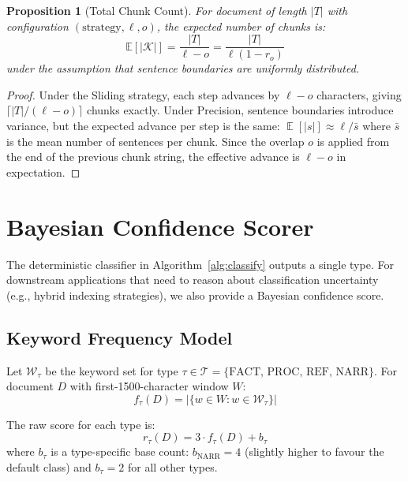 \documentclass[conference]{IEEEtran}
\newtheorem{proposition}[theorem]{Proposition}
\DeclareMathOperator{\E}{\mathbb{E}}
\begin{document}
\begin{proposition}[Total Chunk Count]
\label{prop:chunks}
For document of length $|T|$ with configuration
$(\text{strategy}, \ell, o)$, the expected number of
chunks is:
\begin{equation}
  \mathbb{E}[|\mathcal{K}|] = \frac{|T|}{\ell - o}
    = \frac{|T|}{\ell (1 - r_o)}
  \label{eq:chunk_count}
\end{equation}
under the assumption that sentence boundaries are
uniformly distributed.
\end{proposition}
\begin{proof}
Under the Sliding strategy, each step advances by
$\ell - o$ characters, giving $\lceil |T| / (\ell - o) \rceil$
chunks exactly. Under Precision, sentence boundaries
introduce variance, but the expected advance per step is
the same: $\E[|s|] \approx \ell / \bar{s}$ where $\bar{s}$
is the mean number of sentences per chunk. Since the
overlap $o$ is applied from the end of the previous chunk
string, the effective advance is $\ell - o$ in expectation.
\end{proof}

\section{Bayesian Confidence Scorer}
\label{sec:confidence}

The deterministic classifier in Algorithm~\ref{alg:classify}
outputs a single type. For downstream applications that
need to reason about classification uncertainty (e.g.,
hybrid indexing strategies), we also provide a Bayesian
confidence score.

\subsection{Keyword Frequency Model}

Let $\mathcal{W}_\tau$ be the keyword set for type $\tau
\in \mathcal{T} = \{\text{FACT, PROC, REF, NARR}\}$.
For document $D$ with first-1500-character window $W$:
\begin{equation}
  f_\tau(D) = |\{w \in W : w \in \mathcal{W}_\tau\}|
  \label{eq:freq}
\end{equation}

The raw score for each type is:
\begin{equation}
  r_\tau(D) = 3 \cdot f_\tau(D) + b_\tau
  \label{eq:raw_score}
\end{equation}
where $b_\tau$ is a type-specific base count:
$b_{\text{NARR}} = 4$ (slightly higher to favour the
default class) and $b_\tau = 2$ for all other types.
\end{document}
